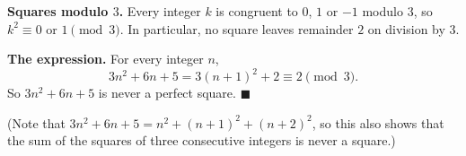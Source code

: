 \textbf{Squares modulo $3$.} Every integer $k$ is congruent to $0$, $1$ or $-1$ modulo $3$, so $k^2\equiv0$ or $1\pmod3$. In particular, no square leaves remainder $2$ on division by $3$.

\textbf{The expression.} For every integer $n$,
\[3n^2+6n+5=3(n+1)^2+2\equiv2\pmod3.\]
So $3n^2+6n+5$ is never a perfect square. $\blacksquare$

(Note that $3n^2+6n+5=n^2+(n+1)^2+(n+2)^2$, so this also shows that the sum of the squares of three consecutive integers is never a square.)
